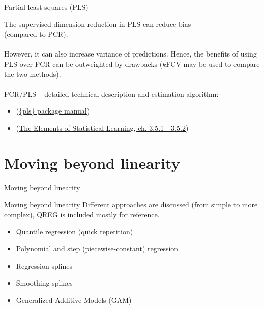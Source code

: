 \documentclass{beamer}
\begin{document}
\begin{frame}{Partial least squares (PLS)}

The supervised dimension reduction in PLS can reduce bias \\(compared to PCR). \\~\\However, it can also increase variance of predictions. Hence, the benefits of using PLS over PCR can be outweighted by drawbacks ($k$FCV may be used to compare the two methods).\\~\\

PCR/PLS -- detailed technical description and estimation algorithm:
\begin{itemize}
\item (\textcolor{blue}{\underline{\href{https://cran.r-project.org/web/packages/pls/vignettes/pls-manual.pdf}{\{pls\} package manual}}})
\item (\textcolor{blue}{\underline{\href{https://web.stanford.edu/~hastie/ElemStatLearn/}{The Elements of 
Statistical Learning, ch. 3.5.1---3.5.2}}})
\end{itemize}
\end{frame}
\section{Moving beyond linearity}
\begin{frame}{Moving beyond linearity}
\end{frame}
\begin{frame}{Moving beyond linearity}
Different approaches are discussed (from simple to more complex), QREG is included mostly for reference.\\
\bigskip

\begin{itemize}
\item Quantile regression (quick repetition)
\smallskip
\item Polynomial and step (piecewise-constant) regression
\smallskip
\item Regression splines
\smallskip
\item Smoothing splines
\smallskip
\item Generalized Additive Models (GAM)
\end{itemize}
\end{frame}
\end{document}
